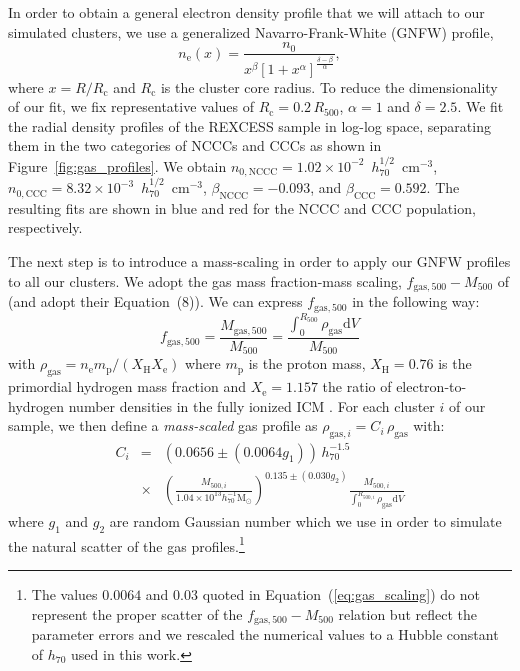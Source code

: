 \documentclass[traditabstract]{aa}
\newcommand{\rmn}{\mathrm}
\begin{document}
In order to obtain a general electron density profile that we will attach to our
simulated clusters, we use a generalized Navarro-Frank-White (GNFW) profile,
\begin{equation}
n_{\rmn{e}}(x) = \frac{n_{0}}{x^{\beta}\left[1+x^{\alpha}\right]^{\frac{\delta-\beta}{\alpha}}},
\label{eq:gnfw}
\end{equation}
where $x=R/R_{\rmn{c}}$ and $R_{\rmn{c}}$ is the cluster core radius. To reduce
the dimensionality of our fit, we fix representative values of $R_{\rmn{c}} =
0.2\, R_{500}$, $\alpha = 1$ and $\delta = 2.5$. We fit the radial density
profiles of the REXCESS sample in log-log space, separating them in the two
categories of NCCCs and CCCs as shown in Figure~\ref{fig:gas_profiles}.  We
obtain $n_{\rmn{0,NCCC}} = 1.02\times10^{-2}$~$h_{70}^{1/2}$~cm$^{-3}$,
$n_{\rmn{0,CCC}} = 8.32\times10^{-3}$~$h_{70}^{1/2}$~cm$^{-3}$,
$\beta_{\rmn{NCCC}} = -0.093$, and $\beta_{\rmn{CCC}} = 0.592$. The resulting
fits are shown in blue and red for the NCCC and CCC population, respectively.

The next step is to introduce a mass-scaling in order to apply our GNFW profiles
to all our clusters. We adopt the gas mass fraction-mass scaling,
$f_{\rmn{gas},500}-M_{500}$ of \cite{2009ApJ...693.1142S} (and adopt their Equation~(8)). We can
express $f_{\rmn{gas},500}$ in the following way:
\begin{equation}
f_{\rmn{gas},500} = \frac{M_{\rmn{gas},500}}{M_{500}}  = \frac{\int_{0}^{R_{500}} \rho_{\rmn{gas}} \rmn{d}V}{M_{500}}
\label{eq:m500}
\end{equation}
with $\rho_{\rmn{gas}} = n_{\rmn{e}} m_{\rmn{p}} / ( X_{\rmn{H}}X_{\rmn{e}} )$ where
$m_{\rmn{p}}$ is the proton mass, $X_{\rmn{H}} = 0.76$ is the primordial hydrogen
mass fraction and $X_{\rmn{e}} = 1.157$ the ratio of electron-to-hydrogen number
densities in the fully ionized ICM \citep{1988xrec.book.....S}. For each cluster
$i$ of our sample, we then define a \emph{mass-scaled} gas profile as
$\rho_{\rmn{gas},i}=C_{i} \,\rho_{\rmn{gas}}$ with:
\begin{eqnarray}
C_{i}  & = &  (0.0656\pm(0.0064g_{1})) \, h_{70}^{-1.5}  \nonumber \\
 & \times & \left(\frac{M_{500,i}}{1.04 \times 10^{13} h_{70}^{-1} \rmn{M_{\odot}}}\right)^{0.135\pm(0.030g_{2})} \frac{M_{500,i}}{\int_{0}^{R_{500,i}} \rho_{\rmn{gas}} \rmn{d}V}
\label{eq:gas_scaling}
\end{eqnarray}
where $g_{1}$ and $g_{2}$ are random Gaussian number which we use in order to
simulate the natural scatter of the gas profiles.\footnote{The values
  $0.0064$ and $0.03$ quoted in Equation~(\ref{eq:gas_scaling}) do not represent
  the proper scatter of the $f_{\rmn{gas},500}-M_{500}$ relation but reflect the
  parameter errors and we rescaled the numerical values to a Hubble constant of
  $h_{70}$ used in this work.}
\end{document}
